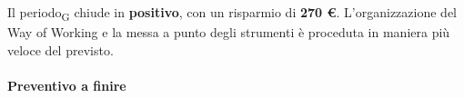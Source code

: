 Il periodo\textsubscript{G} chiude in \textbf{positivo}, con un risparmio di \textbf{270 \euro}. L'organizzazione del Way of Working e la messa a punto degli strumenti è proceduta in maniera più veloce del previsto.


\paragraph{Preventivo a finire}
\subparagraph*{}

\pafTable{
	
}

